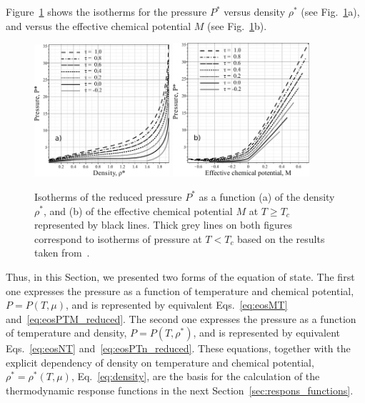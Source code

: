 Figure~\ref{fig1} shows the isotherms for the pressure $P^*$ versus density $\rho^*$ (see Fig.~\ref{fig1}a), and versus the effective chemical potential $M$ (see Fig.~\ref{fig1}b).
\begin{figure}[h!]
	\centering 
	\includegraphics[width=0.446\textwidth]{f1a1.pdf} 
	\includegraphics[width=0.45\textwidth]{f1b1.pdf} 
	\vskip-3mm\caption{Isotherms of the reduced pressure $P^*$ as a function (a) of the density $\rho^*$, and (b) of the effective chemical potential $M$ at $T \geq T_c$ represented by black lines. Thick grey lines on both figures correspond to isotherms of pressure at $T < T_c$ based on the results taken from~\cite{KozlovskiiDobush2020}.
	}\label{fig1}
\end{figure}

Thus, in this Section, we presented two forms of the equation of state. The first one expresses the pressure as a function of temperature and chemical potential, $P = P(T, \mu)$, and is represented by equivalent Eqs.~\eqref{eq:eosMT} and~\eqref{eq:eosPTM_reduced}. The second one expresses the pressure as a function of temperature and density, $P = P(T, \rho^*)$, and is represented by equivalent Eqs.~\eqref{eq:eosNT} and~\eqref{eq:eosPTn_reduced}. These equations, together with the explicit dependency of density on temperature and chemical potential, $\rho^* = \rho^*(T, \mu)$, Eq.~\eqref{eq:density}, are the basis for the calculation of the thermodynamic response functions in the next Section~\ref{sec:respons_functions}. 

